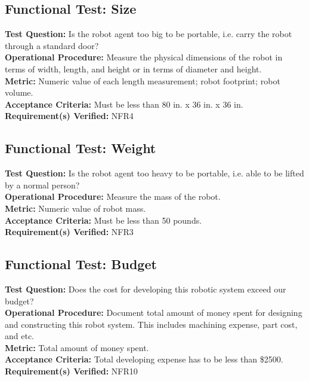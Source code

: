 \subsection{Functional Test: Size}
\label{test:sys_ft_size}
\textbf{Test Question:} Is the robot agent too big to be portable, i.e. carry the robot through a standard door?\\
\textbf{Operational Procedure:} Measure the physical dimensions of the robot in terms of width, length, and height or in terms of diameter and height. \\
\textbf{Metric:} Numeric value of each length measurement; robot footprint; robot volume.\\
\textbf{Acceptance Criteria:} Must be less than 80 in. x 36 in. x 36 in. \\
\textbf{Requirement(s) Verified:} NFR4 \\

\subsection{Functional Test: Weight}
\label{test:sys_ft_weight}
\textbf{Test Question:} Is the robot agent too heavy to be portable, i.e. able to be lifted by a normal person?\\
\textbf{Operational Procedure:} Measure the mass of the robot. \\
\textbf{Metric:} Numeric value of robot mass.\\
\textbf{Acceptance Criteria:} Must be less than 50 pounds. \\
\textbf{Requirement(s) Verified:} NFR3 \\

\subsection{Functional Test: Budget}
\label{test:sys_ft_budget}
\textbf{Test Question:} Does the cost for developing this robotic system exceed our budget?\\
\textbf{Operational Procedure:} Document total amount of money spent for designing and constructing this robot system. This includes machining expense, part cost, and etc. \\
\textbf{Metric:} Total amount of money spent.\\
\textbf{Acceptance Criteria:} Total developing expense has to be less than \$2500. \\
\textbf{Requirement(s) Verified:} NFR10 \\

